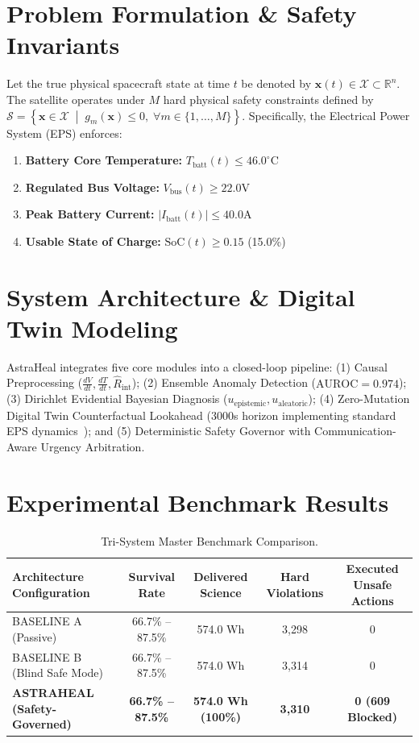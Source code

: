 \documentclass[journal]{article}
\begin{document}
\section{Problem Formulation \& Safety Invariants}
Let the true physical spacecraft state at time $t$ be denoted by $\mathbf{x}(t) \in \mathcal{X} \subset \mathbb{R}^n$. The satellite operates under $M$ hard physical safety constraints defined by $\mathcal{S} = \left\{ \mathbf{x} \in \mathcal{X} \;\middle|\; g_m(\mathbf{x}) \le 0, \;\forall m \in \{1, \dots, M\} \right\}$. Specifically, the Electrical Power System (EPS) enforces:
\begin{enumerate}
    \item \textbf{Battery Core Temperature:} $T_{\text{batt}}(t) \le 46.0^\circ\text{C}$
    \item \textbf{Regulated Bus Voltage:} $V_{\text{bus}}(t) \ge 22.0\text{V}$
    \item \textbf{Peak Battery Current:} $|I_{\text{batt}}(t)| \le 40.0\text{A}$
    \item \textbf{Usable State of Charge:} $\text{SoC}(t) \ge 0.15$ (15.0\%)
\end{enumerate}

\section{System Architecture \& Digital Twin Modeling}
AstraHeal integrates five core modules into a closed-loop pipeline: (1) Causal Preprocessing ($\frac{dV}{dt}, \frac{dT}{dt}, \widehat{R}_{\text{int}}$); (2) Ensemble Anomaly Detection ($\text{AUROC} = 0.974$); (3) Dirichlet Evidential Bayesian Diagnosis ($u_{\text{epistemic}}, u_{\text{aleatoric}}$); (4) Zero-Mutation Digital Twin Counterfactual Lookahead (3000s horizon implementing standard EPS dynamics~\cite{chen2012thevenin, wertz2011space}); and (5) Deterministic Safety Governor with Communication-Aware Urgency Arbitration.

\section{Experimental Benchmark Results}

\begin{table}[htbp]
\centering
\caption{Tri-System Master Benchmark Comparison.}
\label{tab:master_benchmark}
\begin{tabular}{lcccc}
\toprule
\textbf{Architecture Configuration} & \textbf{Survival Rate} & \textbf{Delivered Science} & \textbf{Hard Violations} & \textbf{Executed Unsafe Actions} \\
\midrule
BASELINE A (Passive) & 66.7\% – 87.5\% & 574.0 Wh & 3,298 & 0 \\
BASELINE B (Blind Safe Mode) & 66.7\% – 87.5\% & 574.0 Wh & 3,314 & 0 \\
\textbf{ASTRAHEAL (Safety-Governed)} & \textbf{66.7\% – 87.5\%} & \textbf{574.0 Wh (100\%)} & \textbf{3,310} & \textbf{0 (609 Blocked)} \\
\bottomrule
\end{tabular}
\end{table}
\end{document}

